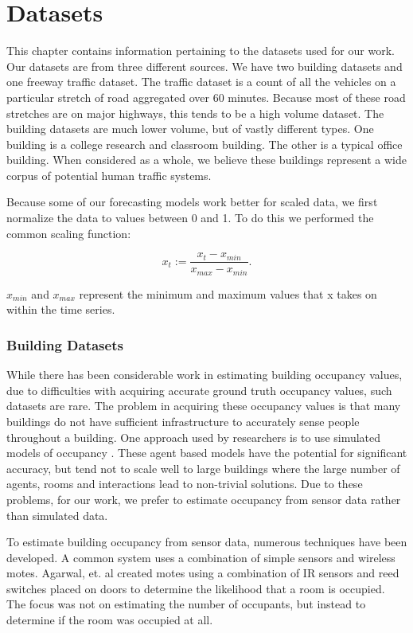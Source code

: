 \chapter{Datasets}

This chapter contains information pertaining to the datasets used for our work.  Our datasets are from three different sources.  We have two building datasets and one freeway traffic dataset.  The traffic dataset is a count of all the vehicles on a particular stretch of road aggregated over 60 minutes.  Because most of these road stretches are on major highways, this tends to be a high volume dataset.  The building datasets are much lower volume, but of vastly different types.  One building is a college research and classroom building.  The other is a typical office building.  When considered as a whole, we believe these buildings represent a wide corpus of potential human traffic systems.  

Because some of our forecasting models work better for scaled data, we first normalize the data to values between 0 and 1.  To do this we performed the common scaling function:

\begin{equation}
	x_{t} := \frac{x_{t} - x_{min}}{x_{max} - x_{min}}.
\end{equation}

$x_{min}$ and $x_{max}$ represent the minimum and maximum values that x takes on within the time series.

\subsection{Building Datasets}
While there has been considerable work in estimating building occupancy values, due to difficulties with acquiring accurate ground truth occupancy values, such datasets are rare.  The problem in acquiring these occupancy values is that many buildings do not have sufficient infrastructure to accurately sense people throughout a building.  One approach used by researchers is to use simulated models of occupancy \cite{page2008, goldstein2010}.  These agent based models have the potential for significant accuracy, but tend not to scale well to large buildings where the large number of agents, rooms and interactions lead to non-trivial solutions.  Due to these problems, for our work, we prefer to estimate occupancy from sensor data rather than simulated data.

To estimate building occupancy from sensor data, numerous techniques have been developed.  A common system uses a combination of simple sensors and wireless motes.  Agarwal, et. al \cite{agarwal2010} created motes using a combination of IR sensors and reed switches placed on doors to determine the likelihood that a room is occupied.  The focus was not on estimating the number of occupants, but instead to determine if the room was occupied at all.  

